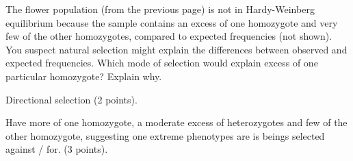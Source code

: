 \question[5]
The flower population (from the previous page) is not in Hardy-Weinberg equilibrium because the sample contains an excess of one homozygote and very few of the other homozygotes, compared to expected frequencies (not shown).  You suspect natural selection might explain the differences between observed and expected frequencies.  Which mode of selection would explain excess of one particular homozygote?  Explain why. 

\begin{solution}
Directional selection (2 points). 

Have more of one homozygote, a moderate excess of heterozygotes and few of the other homozygote, suggesting one extreme phenotypes are is beings selected against / for. (3 points).

\end{solution}
